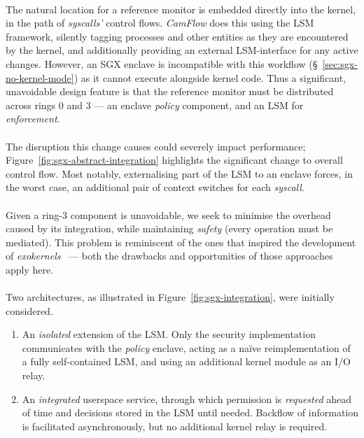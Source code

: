 \paragraph{} The natural location for a reference monitor is embedded directly into the kernel, in the path of \textit{syscalls'} control flows. \textit{CamFlow} does this using the LSM framework, silently tagging processes and other entities as they are encountered by the kernel, and additionally providing an external LSM-interface for any active changes. However, an SGX enclave is incompatible with this workflow (§~\ref{sec:sgx-no-kernel-mode}) as it cannot execute alongside kernel code. Thus a significant, unavoidable design feature is that the reference monitor must be distributed across rings 0 and 3 --- an enclave \textit{policy} component, and an LSM for \textit{enforcement}.

\paragraph{} The disruption this change causes could severely impact performance; Figure~\ref{fig:sgx-abstract-integration} highlights the significant change to overall control flow. Most notably, externalising part of the LSM to an enclave forces, in the worst case, an additional pair of context switches for each \textit{syscall}.

\paragraph{} Given a ring-3 component is unavoidable, we seek to minimise the overhead caused by its integration, while maintaining \textit{safety} (every operation must be mediated). This problem is reminiscent of the ones that inspired the development of \textit{exokernels}~\cite{10.1145/224056.224076} --- both the drawbacks and opportunities of those approaches apply here.~\cite{10.1145/269005.266644} 

\paragraph{} Two architectures, as illustrated in Figure~\ref{fig:sgx-integration}, were initially considered. 

\begin{enumerate}
    \item An \textit{isolated} extension of the LSM. Only the security implementation communicates with the \textit{policy} enclave, acting as a na\"{i}ve reimplementation of a fully self-contained LSM, and using an additional kernel module as an I/O relay.
    \item An \textit{integrated} userspace service, through which permission is \textit{requested} ahead of time and decisions stored in the LSM until needed. Backflow of information is facilitated asynchronously, but no additional kernel relay is required.
\end{enumerate}



